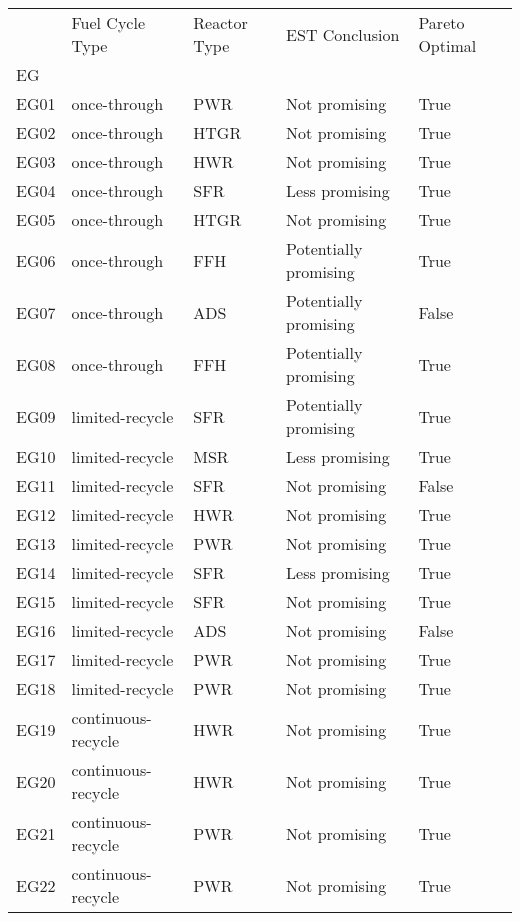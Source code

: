 \begin{tabular}{lllll}
\toprule
 & Fuel Cycle Type & Reactor Type & EST Conclusion & Pareto Optimal \\
EG &  &  &  &  \\
\midrule
\rowcolor{orange}
EG01 & once-through & PWR & Not promising & True \\
\rowcolor{orange}
EG02 & once-through & HTGR & Not promising & True \\
\rowcolor{orange}
EG03 & once-through & HWR & Not promising & True \\
\rowcolor{lime}
EG04 & once-through & SFR & Less promising & True \\
\rowcolor{orange}
EG05 & once-through & HTGR & Not promising & True \\
EG06 & once-through & FFH & Potentially promising & True \\
\rowcolor{yellow}
EG07 & once-through & ADS & Potentially promising & False \\
EG08 & once-through & FFH & Potentially promising & True \\
EG09 & limited-recycle & SFR & Potentially promising & True \\
EG10 & limited-recycle & MSR & Less promising & True \\
EG11 & limited-recycle & SFR & Not promising & False \\
\rowcolor{orange}
EG12 & limited-recycle & HWR & Not promising & True \\
\rowcolor{orange}
EG13 & limited-recycle & PWR & Not promising & True \\
EG14 & limited-recycle & SFR & Less promising & True \\
\rowcolor{orange}
EG15 & limited-recycle & SFR & Not promising & True \\
EG16 & limited-recycle & ADS & Not promising & False \\
\rowcolor{orange}
EG17 & limited-recycle & PWR & Not promising & True \\
\rowcolor{orange}
EG18 & limited-recycle & PWR & Not promising & True \\
\rowcolor{orange}
EG19 & continuous-recycle & HWR & Not promising & True \\
\rowcolor{orange}
EG20 & continuous-recycle & HWR & Not promising & True \\
\rowcolor{orange}
EG21 & continuous-recycle & PWR & Not promising & True \\
\rowcolor{orange}
EG22 & continuous-recycle & PWR & Not promising & True \\

\end{tabular}

